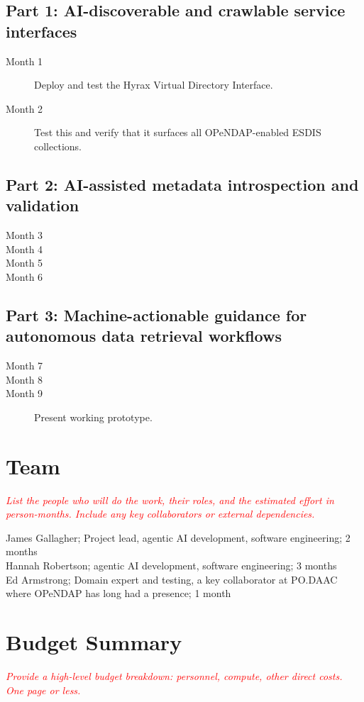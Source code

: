 \documentclass[11pt]{article}
\begin{document}
\subsection*{Part 1: AI-discoverable and crawlable service interfaces} 
\begin{description}
    \item [Month 1] Deploy and test the Hyrax Virtual Directory Interface.
    \item [Month 2] Test this and verify that it surfaces all \ac{OPeNDAP}-enabled \ac{ESDIS} collections. 
\end{description}

\subsection*{Part 2: AI-assisted metadata introspection and validation} 
\begin{description}
    \item [Month 3] 
    \item [Month 4] 
    \item [Month 5] 
    \item [Month 6]
    \end{description}

\subsection*{Part 3: Machine-actionable guidance for autonomous data retrieval workflows} 
\begin{description}
    \item [Month 7] 
    \item [Month 8] 
    \item [Month 9] Present working prototype. 
\end{description}

\section{Team}
\textcolor{red}{\textit{List the people who will do the work, their roles, and the estimated effort in person-months. Include any key collaborators or external dependencies.}}

\begin{flushleft}
\noindent James Gallagher; Project lead, agentic \ac{AI} development, software engineering; 2 months\\
Hannah Robertson; agentic \ac{AI} development, software engineering; 3 months\\
Ed Armstrong; Domain expert and testing, a key collaborator at \ac{PO.DAAC} where \ac{OPeNDAP} has long had a presence; 1 month\\
\end{flushleft}

\section{Budget Summary}
\textcolor{red}{\textit{Provide a high-level budget breakdown: personnel, compute, other direct costs. One page or less.}}



\end{document}
